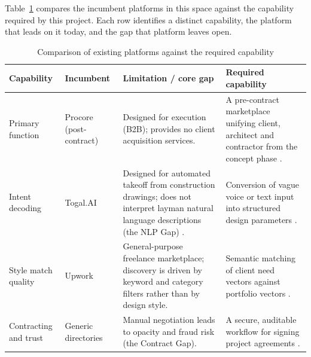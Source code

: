 Table~\ref{tab:lit-comparison} compares the incumbent platforms in this
space against the capability required by this project. Each row
identifies a distinct capability, the platform that leads on it today,
and the gap that platform leaves open.

\begin{table}[H]
  \centering
  \caption{Comparison of existing platforms against the required capability}
  \label{tab:lit-comparison}
  \small
  \begin{tabularx}{\textwidth}{|p{2.1cm}|p{2.4cm}|X|X|}
    \hline
    \textbf{Capability} & \textbf{Incumbent} &
    \textbf{Limitation / core gap} & \textbf{Required capability} \\
    \hline
    Primary function &
    Procore (post-contract) \cite{procore2025overview} &
    Designed for execution (B2B); provides no client acquisition
    services. &
    A pre-contract marketplace unifying client, architect and
    contractor from the concept phase \cite{hossain2018platform}. \\
    \hline
    Intent decoding &
    Togal.AI \cite{togal2025overview} &
    Designed for automated takeoff from construction drawings; does not
    interpret layman natural language descriptions (the NLP Gap)
    \cite{lee2017extraction}. &
    Conversion of vague voice or text input into structured design
    parameters \cite{radford2022whisper, wu2022nlp}. \\
    \hline
    Style match quality &
    Upwork \cite{upwork2025overview} &
    General-purpose freelance marketplace; discovery is driven by
    keyword and category filters rather than by design style. &
    Semantic matching of client need vectors against portfolio vectors
    \cite{reimers2019sbert, zhang2021hybrid}. \\
    \hline
    Contracting and trust &
    Generic directories &
    Manual negotiation leads to opacity and fraud risk (the Contract
    Gap). &
    A secure, auditable workflow for signing project agreements
    \cite{li2019blockchain, hawlitschek2016trust}. \\
    \hline
  \end{tabularx}
\end{table}

